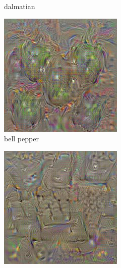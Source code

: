 \begin{figure}[htbp]
\begin{subfigure}[b]{0.3\textwidth}
    \caption{dalmatian}
    \label{fig:sec:context:deep-visualization-class-2}
  \end{subfigure}
  \hfill
  \begin{subfigure}[b]{0.3\textwidth}
    \includegraphics[width=\textwidth]{gfx/deep-visualization-class-3}
    \caption{bell pepper}
    \label{fig:sec:context:deep-visualization-class-3}
  \end{subfigure}
  \par\medskip
  \begin{subfigure}[b]{0.3\textwidth}
    \includegraphics[width=\textwidth]{gfx/deep-visualization-class-4}

\end{subfigure}
\end{figure}
